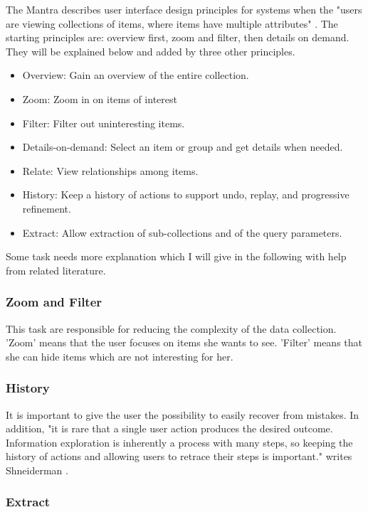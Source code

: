 \documentclass[11pt]{report}
\begin{document}
The Mantra describes user interface design principles for systems when the "users are viewing collections of items, where items have multiple attributes" \cite{Shneiderman1996}. The starting principles are: overview first, zoom and filter, then details on demand. They will be explained below and added by three other principles. \\

\begin{itemize}
	\item Overview: Gain an overview of the entire collection.
	\item Zoom: Zoom in on items of interest
	\item Filter: Filter out uninteresting items.
	\item Details-on-demand: Select an item or group and get details when needed.
	\item Relate: View relationships among items.
	\item History: Keep a history of actions to support undo, replay, and progressive refinement.
	\item Extract: Allow extraction of sub-collections and of the query parameters.
\end{itemize}

Some task needs more explanation which I will give in the following with help from related literature.

\subsubsection{Zoom and Filter}

This task are responsible for reducing the complexity of the data collection. 'Zoom' means that the user focuses on items she wants to see. 'Filter' means that she can hide items which are not interesting for her.

\subsubsection{History}

It is important to give the user the possibility to easily recover from mistakes. In addition, "it is rare that a single user action produces the desired outcome. Information exploration is inherently a process with many steps, so keeping the history of actions and allowing users to retrace their steps is important." writes Shneiderman \cite{Shneiderman1996}.

\subsubsection{Extract}
\end{document}
